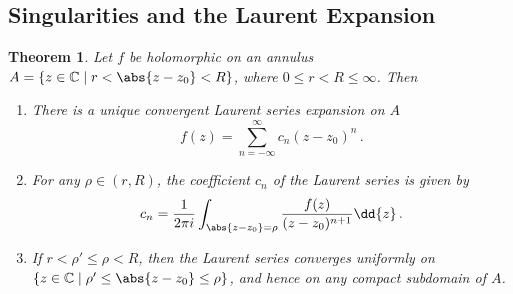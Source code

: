 \documentclass{article}
\theoremstyle{plain}\theoremheaderfont{\normalfont\itshape}\theorembodyfont{\rmfamily}\theoremseparator{.}\newtheorem*{rem}{Remark}\newtheorem*{ex}{Example}\newtheorem*{proof}{Proof}\newtheorem*{altp}{Alternative proof}
\theoremstyle{plain}\theoremheaderfont{\normalfont\bfseries}\theorembodyfont{\rmfamily}\theoremseparator{.}\newtheorem{thm}{Theorem}[section]\newtheorem{lem}[thm]{Lemma}\newtheorem{prop}[thm]{Proposition}\newtheorem*{cor}{Corollary}\newtheorem{defn}[thm]{Definition}\newtheorem{clm}[thm]{Claim}\newtheorem{clminproof}{Claim}
\theoremstyle{break}\theoremheaderfont{\normalfont\itshape}\theorembodyfont{\rmfamily}\theoremseparator{.\medskip}\newtheorem*{proofskip}{Proof}\newtheorem*{exs}{Examples}\newtheorem*{rems}{Remarks}
\theoremstyle{break}\theoremheaderfont{\normalfont\bfseries}\theorembodyfont{\rmfamily}\theoremseparator{.\medskip}\newtheorem{lemskip}[thm]{Lemma}\newtheorem{defnskip}[thm]{Definition}\newtheorem{propskip}[thm]{Proposition}\newtheorem{thmskip}[thm]{Theorem}
\numberwithin{equation}{section}
\begin{document}
	\subsection{Singularities and the Laurent Expansion}
	\begin{thm}
		Let \(f\) be holomorphic on an annulus \(A=\{z\in\mathbb{C}\mid r<\abs{z-z_0}<R\}\), where \(0\le r<R\le\infty\). Then
		\begin{enumerate}[topsep=0pt]
			\item[(i)] There is a unique convergent \textit{Laurent series expansion} on \(A\)
			\[f(z)=\sum_{n=-\infty}^{\infty}c_n(z-z_0)^n\,.\]
			\item[(ii)] For any \(\rho\in(r,R)\), the coefficient \(c_n\) of the Laurent series is given by
			\[c_n=\frac{1}{2\pi i}\int_{\abs{z-z_0}=\rho}\frac{f(z)}{(z-z_0)^{n+1}}\dd{z}\,.\]
			\item[(iii)] If \(r<\rho'\le\rho<R\), then the Laurent series converges uniformly on \(\{z\in\mathbb{C}\mid \rho'\le\abs{z-z_0}\le\rho\}\), and hence on any compact subdomain of \(A\).
		\end{enumerate}
	\end{thm}
\end{document}

